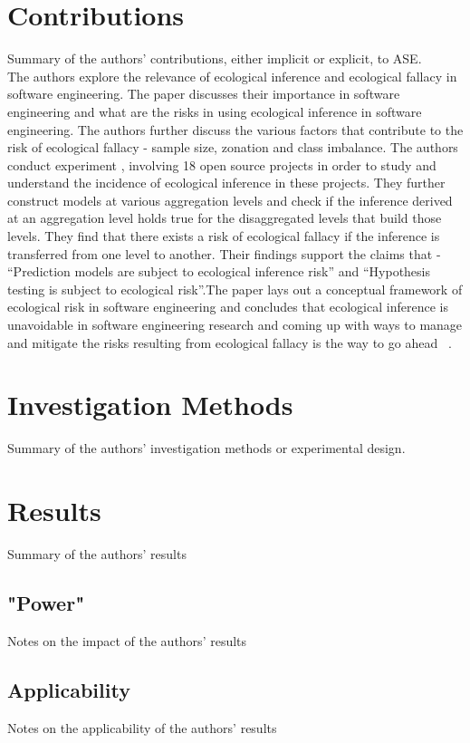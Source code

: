 \documentclass{acm_proc_article-sp}
\begin{document}
\section{Contributions}\label{contrib}
Summary of the authors' contributions, either implicit or explicit, to ASE. \\
	The authors explore the relevance of ecological inference and ecological fallacy in software engineering. The paper discusses their importance in software engineering and 
what are the risks in using ecological inference in software engineering. The authors further discuss the various factors that contribute to the risk of ecological fallacy - sample size,
zonation and class imbalance. The authors conduct experiment , involving 18 open source projects in order to study and understand the incidence of ecological inference in these projects.
They further construct models at various aggregation levels and check if the inference derived at an aggregation level holds true for the disaggregated levels that build those levels. They find
that there exists a risk of ecological fallacy if the inference is transferred from one level to another. Their findings support the claims that - ``Prediction models are subject to ecological
inference risk'' and ``Hypothesis testing is subject to ecological risk''.The paper lays out a conceptual framework of ecological risk in software engineering and concludes that ecological
inference is unavoidable in software engineering research and coming up with ways to manage and mitigate the risks resulting from ecological fallacy is the way to go ahead ~\cite{posnett:2011}.

\section{Investigation Methods}
\label{invest}
Summary of the authors' investigation methods or experimental design.

\section{Results}
\label{results}
Summary of the authors' results

\subsection{"Power"}
\label{results-power}
Notes on the impact of the authors' results

\subsection{Applicability}
\label{results-apply}
Notes on the applicability of the authors' results
\end{document}
